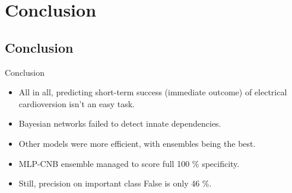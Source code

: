 \documentclass[hyperref={bookmarks=false}]{beamer}
\begin{document}
\section{Conclusion}
\subsection{Conclusion}
\begin{frame}{Conclusion}
\begin{itemize}
    \item All in all, predicting short-term success (immediate outcome) of electrical cardioversion isn't an easy task.
    \item Bayesian networks failed to detect innate dependencies.
    \item Other models were more efficient, with ensembles being the best.
    \item MLP-CNB ensemble managed to score full 100 \% specificity.
    \item Still, precision on important class False is only 46 \%.
\end{itemize}
\end{frame}
\end{document}
